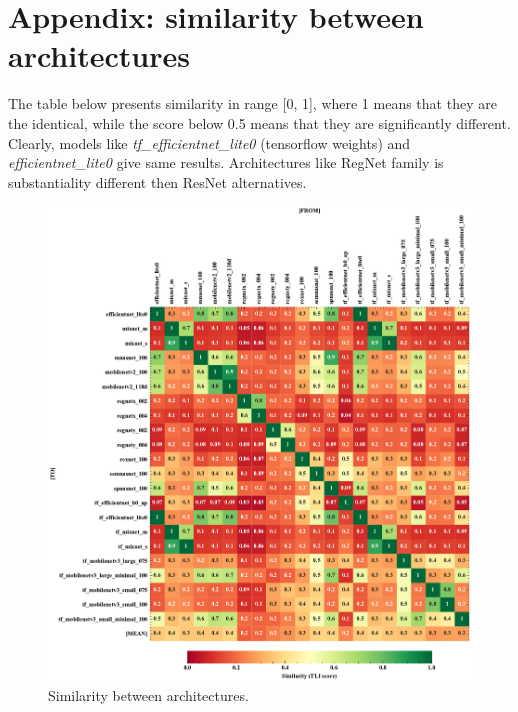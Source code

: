 \documentclass{article} %
\begin{document}




\newpage
\appendix
\section{Appendix: similarity between architectures}

The table below presents similarity in range [0, 1], where 1 means that they are the
identical, while the score below 0.5 means that they are significantly different.
Clearly, models like
\textit{tf\_efficientnet\_lite0} (tensorflow weights) and
\textit{efficientnet\_lite0} give same results. Architectures like RegNet
family is substantiality different then ResNet alternatives.

\begin{figure}[h]
	\begin{center}
	\center\includegraphics[width=\linewidth]{figures/v1_matrix}
	\end{center}
	\caption{Similarity between architectures.}
	\label{fig:matrix}
\end{figure}
\end{document}
